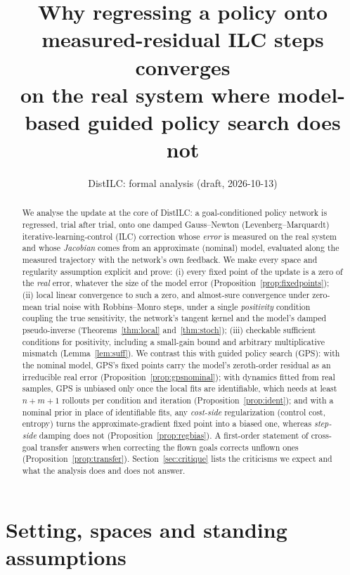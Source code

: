 \documentclass[11pt]{article}
\title{Why regressing a policy onto measured-residual ILC steps converges\\ on the real system where model-based guided policy search does not}
\author{DistILC: formal analysis (draft, 2026-10-13)}
\date{}
\theoremstyle{definition}
\theoremstyle{remark}
\begin{document}
\maketitle

\begin{abstract}
We analyse the update at the core of DistILC: a goal-conditioned policy network is regressed, trial after trial, onto
one damped Gauss--Newton (Levenberg--Marquardt) iterative-learning-control (ILC) correction whose \emph{error} is
measured on the real system and whose \emph{Jacobian} comes from an approximate (nominal) model, evaluated along the
measured trajectory with the network's own feedback. We make every space and regularity assumption explicit and prove:
(i) every fixed point of the update is a zero of the \emph{real} error, whatever the size of the model error
(Proposition~\ref{prop:fixedpoints}); (ii) local linear convergence to such a zero, and almost-sure convergence under
zero-mean trial noise with Robbins--Monro steps, under a single \emph{positivity} condition coupling the true
sensitivity, the network's tangent kernel and the model's damped pseudo-inverse (Theorems~\ref{thm:local}
and~\ref{thm:stoch}); (iii) checkable sufficient conditions for positivity, including a small-gain bound and arbitrary
multiplicative mismatch (Lemma~\ref{lem:suff}). We contrast this with guided policy search (GPS): with the nominal
model, GPS's fixed points carry the model's zeroth-order residual as an irreducible real error
(Proposition~\ref{prop:gpsnominal}); with dynamics fitted from real samples, GPS is unbiased only once the local fits are
identifiable, which needs at least $n+m+1$ rollouts per condition and iteration (Proposition~\ref{prop:ident}); and with
a nominal prior in place of identifiable fits, any \emph{cost-side} regularization (control cost, entropy) turns the
approximate-gradient fixed point into a biased one, whereas \emph{step-side} damping does not
(Proposition~\ref{prop:regbias}). A first-order statement of cross-goal transfer answers when correcting the flown goals
corrects unflown ones (Proposition~\ref{prop:transfer}). Section~\ref{sec:critique} lists the criticisms we expect and
what the analysis does and does not answer.
\end{abstract}

\tableofcontents

\section{Setting, spaces and standing assumptions}\label{sec:setting}
\end{document}
